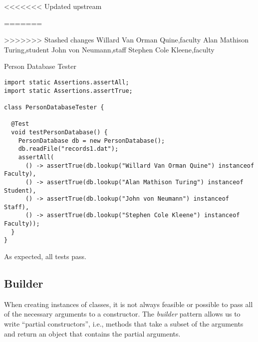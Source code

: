 <<<<<<< Updated upstream
\begin{verbnobox}[\footnotesize]
=======
\begin{verbnobox}[\small]
>>>>>>> Stashed changes
Willard Van Orman Quine,faculty
Alan Mathison Turing,student
John von Neumann,staff
Stephen Cole Kleene,faculty
\end{verbnobox}

\begin{cl}{Person Database Tester}
\begin{lstlisting}[language=MyJava]
import static Assertions.assertAll;
import static Assertions.assertTrue;

class PersonDatabaseTester {

  @Test
  void testPersonDatabase() {
    PersonDatabase db = new PersonDatabase();
    db.readFile("records1.dat");
    assertAll(
      () -> assertTrue(db.lookup("Willard Van Orman Quine") instanceof Faculty),
      () -> assertTrue(db.lookup("Alan Mathison Turing") instanceof Student),
      () -> assertTrue(db.lookup("John von Neumann") instanceof Staff),
      () -> assertTrue(db.lookup("Stephen Cole Kleene") instanceof Faculty));
  }
}
\end{lstlisting}
\end{cl}

As expected, all tests pass.

\subsection*{Builder}

When creating instances of classes, it is not always feasible or possible to pass all of the necessary arguments to a constructor. The \textit{builder} pattern allows us to write ``partial constructors'', i.e., methods that take a subset of the arguments and return an object that contains the partial arguments. 



\end{verbnobox}
